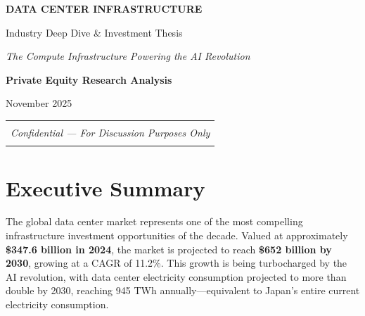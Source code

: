 \documentclass[11pt,a4paper]{article}
\begin{document}
\begin{titlepage}
    \centering
    \vspace*{3cm}
    
    {\Huge\bfseries\color{darkblue} DATA CENTER INFRASTRUCTURE\par}
    \vspace{0.8cm}
    {\LARGE Industry Deep Dive \& Investment Thesis\par}
    \vspace{0.5cm}
    {\large\itshape\color{gray} The Compute Infrastructure Powering the AI Revolution\par}
    
    \vspace{3cm}
    
    {\Large\bfseries Private Equity Research Analysis\par}
    \vspace{0.3cm}
    {\large November 2025\par}
    
    \vfill
    
    \begin{tabular}{c}
        \hline
        \\
        \textit{Confidential — For Discussion Purposes Only}\\
        \\
        \hline
    \end{tabular}
    
\end{titlepage}

\tableofcontents
\newpage

\section{Executive Summary}

The global data center market represents one of the most compelling infrastructure investment opportunities of the decade. Valued at approximately \textbf{\$347.6 billion in 2024}, the market is projected to reach \textbf{\$652 billion by 2030}, growing at a CAGR of 11.2\%. This growth is being turbocharged by the AI revolution, with data center electricity consumption projected to more than double by 2030, reaching 945 TWh annually—equivalent to Japan's entire current electricity consumption.
\end{document}
